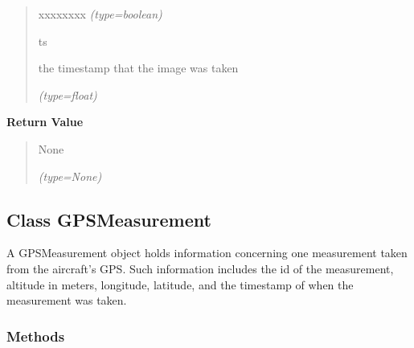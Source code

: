 \begin{boxedminipage}{\funcwidth}
\begin{quote}
\begin{Ventry}{xxxxxxxx}
            {\it (type=boolean)}

          \item[ts]

          the timestamp that the image was taken

            {\it (type=float)}

        \end{Ventry}

      \end{quote}

      \textbf{Return Value}
    \vspace{-1ex}

      \begin{quote}
      None

      {\it (type=None)}

      \end{quote}

    \end{boxedminipage}



\subsection{Class GPSMeasurement}

    \label{client_rest:GPSMeasurement}
A GPSMeasurement object holds information concerning one measurement taken 
from the aircraft's GPS. Such information includes the id of the 
measurement, altitude in meters, longitude, latitude, and the timestamp of 
when the measurement was taken.



  \subsubsection{Methods}

    \label{client_rest:GPSMeasurement:__init__}

